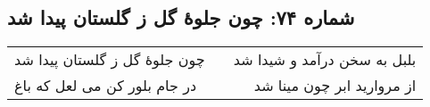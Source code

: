\begin{center}
\section*{شماره ۷۴: چون جلوۀ گل ز گلستان پیدا شد}
\label{sec:074}
\begin{longtable}{l p{0.5cm} r}
چون جلوهٔ گل ز گلستان پیدا شد
&&
بلبل به سخن درآمد و شیدا شد
\\
در جام بلور کن می لعل که باغ
&&
از مروارید ابر چون مینا شد
\\
\end{longtable}
\end{center}

